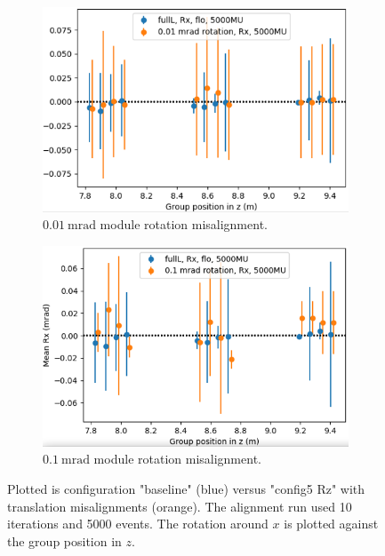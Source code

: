 \begin{figure}
  \centering
  \begin{subfigure}[b]{0.4\textwidth}
    \centering
    \includegraphics[width=\textwidth]{plots/misalign_rota/001_rot_Rx.png}
    \caption{$\SI{0.01}{\milli\radian}$ module rotation misalignment.}
    \label{fig:001Rx}
  \end{subfigure}
  \hfill
  \begin{subfigure}[b]{0.4\textwidth}
    \centering
    \includegraphics[width=\textwidth]{plots/misalign_rota/01_rot_Rx.png}
    \caption{$\SI{0.1}{\milli\radian}$ module rotation misalignment.}
    \label{fig:01Rx}
  \end{subfigure}
  \caption{Plotted is configuration "baseline" (blue) versus "config5 Rz" with translation misalignments (orange). The alignment run used 10 iterations and 5000 events. The rotation around $x$ is plotted against the group position in $z$.}
  \label{fig:mis_rot_Rx}
\end{figure}

